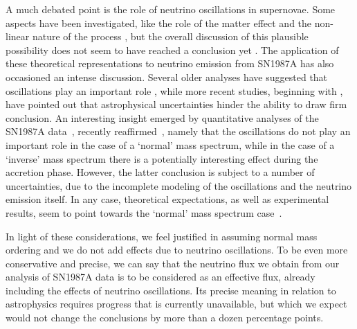 \documentclass[a4paper,11pt]{article}
\begin{document}
A much debated point is the  role of neutrino oscillations in supernovae. Some aspects have been investigated, like %
the role of the matter effect 
\cite{Mikheyev:1989dy,Dighe:1999bi}
and the  non-linear nature of the process \cite{Pantaleone:1992eq}, 
but the overall discussion 
of this plausible possibility 
does not  seem to have reached a conclusion  yet \cite{Volpe:2023met}. 
The application of these theoretical 
representations 
to neutrino emission from SN1987A has also occasioned an intense discussion. 
Several older analyses have suggested that oscillations play an important role \cite{Smirnov:1993ku,Lunardini:2000sw,Minakata:2000rx}, while more recent studies, beginning with \cite{Kachelriess:2001sg, Barger:2002px}, have pointed out that astrophysical uncertainties hinder the ability to draw firm conclusion.
An interesting insight emerged by quantitative analyses of the SN1987A data~\cite{Pagliaroli:2007sda,Pagliaroli:2008ur},  recently reaffirmed~\cite{DedinNeto:2023hhp}, namely that the oscillations do not play an important role in the case of a `normal' mass spectrum, while in the case of a `inverse’ mass spectrum there is a potentially interesting effect during the accretion phase. However, the latter conclusion is subject to a number of uncertainties,  due to the incomplete modeling of the oscillations and  the neutrino emission itself. 
In any case, theoretical expectations, as well as experimental results, seem to point towards the `normal' mass spectrum case~\cite{deSalas:2020pgw,Capozzi:2021fjo,Gonzalez-Garcia:2021dve}. 

In light of these considerations, 
we  feel justified in assuming normal mass ordering and 
 we do not add effects due to neutrino oscillations. To be even more conservative and precise, we can say that the neutrino flux  we obtain from our analysis of SN1987A data is  to be considered as an effective flux,  already including  the effects of neutrino oscillations. Its precise meaning in relation to astrophysics requires progress that is currently unavailable, but which we expect would not  change the conclusions by more than a dozen percentage points.






  
\end{document}

